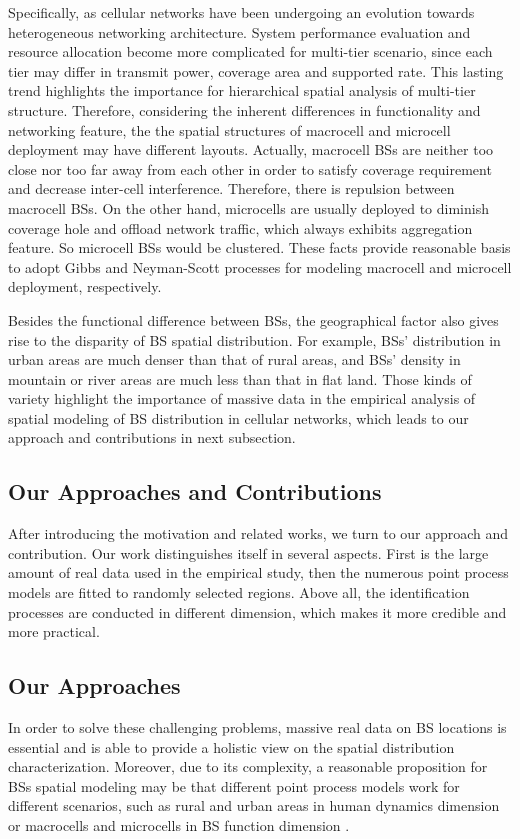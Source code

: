 Specifically, as cellular networks have been undergoing an evolution towards heterogeneous networking architecture. System performance evaluation and resource allocation become more complicated for multi-tier scenario, since each tier may differ in transmit power, coverage area and supported rate\cite{dhillon2012modeling}\cite{cheung2012throughput}. This lasting trend highlights the importance for hierarchical spatial analysis of multi-tier structure. Therefore, considering the inherent differences in functionality and networking feature, the the spatial structures of macrocell and microcell deployment may have different layouts. Actually, macrocell BSs are neither too close nor too far away from each other in order to satisfy coverage requirement and decrease inter-cell interference. Therefore, there is repulsion between macrocell BSs. On the other hand, microcells are usually deployed to diminish coverage hole and offload network traffic, which always exhibits aggregation feature. So microcell BSs would be clustered. These facts provide reasonable basis to adopt Gibbs and Neyman-Scott processes \cite{chiu2013stochastic} for modeling macrocell and microcell deployment, respectively.

Besides the functional difference between BSs, the geographical factor also gives rise to the disparity of BS spatial distribution. For example, BSs' distribution in urban areas are much denser than that of rural areas, and BSs' density in mountain or river areas are much less than that in flat land. Those kinds of variety highlight the importance of massive data in the empirical analysis of spatial modeling of BS distribution in cellular networks, which leads to our approach and contributions in next subsection.

\subsection{Our Approaches and Contributions}
After introducing the motivation and related works, we turn to our approach and contribution. Our work distinguishes itself in several aspects. First is the large amount of real data used in the empirical study, then the numerous point process models are fitted to randomly selected regions. Above all, the identification processes are conducted in different dimension, which makes it more credible and more practical.
\subsection*{Our Approaches}
In order to solve these challenging problems, massive real data on BS locations is essential and is able to provide a holistic view on the spatial distribution characterization. Moreover, due to its complexity, a reasonable proposition for BSs spatial modeling may be that different point process models work for different scenarios, such as rural and urban areas in human dynamics dimension or macrocells and microcells in BS function dimension \cite{wu2014spatial,zhou2014two,zhou2015large}.

